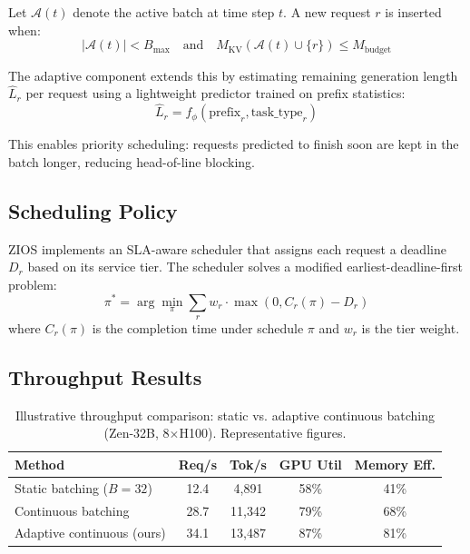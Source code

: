 \documentclass[11pt,a4paper]{article}
\begin{document}
Let $\mathcal{A}(t)$ denote the active batch at time step $t$. A new request $r$ is inserted when:
\begin{equation}
|\mathcal{A}(t)| < B_{\max} \quad \text{and} \quad M_{\text{KV}}(\mathcal{A}(t) \cup \{r\}) \leq M_{\text{budget}}
\end{equation}

The adaptive component extends this by estimating remaining generation length $\hat{L}_r$ per request using a lightweight predictor trained on prefix statistics:
\begin{equation}
\hat{L}_r = f_\phi(\text{prefix}_r, \text{task\_type}_r)
\end{equation}

This enables priority scheduling: requests predicted to finish soon are kept in the batch longer, reducing head-of-line blocking.

\subsection{Scheduling Policy}

ZIOS implements an SLA-aware scheduler that assigns each request a deadline $D_r$ based on its service tier. The scheduler solves a modified earliest-deadline-first problem:
\begin{equation}
\pi^* = \arg\min_\pi \sum_{r} w_r \cdot \max(0, C_r(\pi) - D_r)
\end{equation}
where $C_r(\pi)$ is the completion time under schedule $\pi$ and $w_r$ is the tier weight.

\subsection{Throughput Results}

\begin{table}[H]
\centering
\caption{Illustrative throughput comparison: static vs. adaptive continuous batching (Zen-32B, 8$\times$H100). Representative figures.}
\label{tab:batching_throughput}
\begin{tabular}{lcccc}
\toprule
Method & Req/s & Tok/s & GPU Util & Memory Eff. \\
\midrule
Static batching ($B=32$) & 12.4 & 4,891 & 58\% & 41\% \\
Continuous batching & 28.7 & 11,342 & 79\% & 68\% \\
Adaptive continuous (ours) & 34.1 & 13,487 & 87\% & 81\% \\
\bottomrule
\end{tabular}
\end{table}
\end{document}

